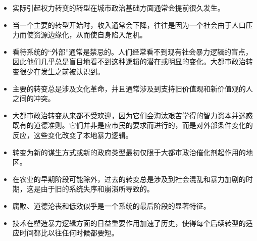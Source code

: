 \begin{paracol}{2}
\switchcolumn
\begin{itemize}
  \item 实际引起权力转变的转型在城市政治基础方面通常会提前很久发生。
  \item 当一个主要的转型开始时，收入通常会下降，往往是因为一个社会由于人口压力而使资源边缘化，从而使自身陷入危机。
  \item 看待系统的“外部”通常是禁忌的。人们经常看不到现有社会暴力逻辑的盲点，因此他们几乎总是盲目地看不到这种逻辑的潜在或明显的变化。大都市政治转变很少在发生之前被认识到。
  \item 主要的转变总是涉及文化革命，并且通常涉及到支持旧价值观和新价值观的人之间的冲突。
  \item 大都市政治转变从来都不受欢迎，因为它们会淘汰艰苦学得的智力资本并迷惑既有的道德准则。它们并非是应市民的要求而进行的，而是对外部条件变化的反应，这些变化改变了本地暴力逻辑。
  \item 转变为新的谋生方式或新的政府类型最初仅限于大都市政治催化剂起作用的地区。
  \item 在农业的早期阶段可能除外，过去的转变总是涉及到社会混乱和暴力加剧的时期，这是由于旧的系统失序和崩溃所导致的。
  \item 腐败、道德沦丧和低效似乎是一个系统的最后阶段的显著特征。
  \item 技术在塑造暴力逻辑方面的日益重要作用加速了历史，使得每个后续转型的适应时间都比以往任何时候都要短。
\end{itemize}
\end{paracol}

